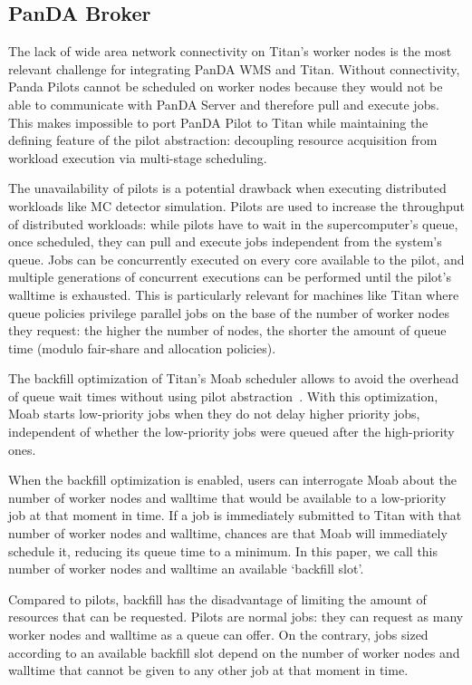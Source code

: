 \subsection{PanDA Broker}\label{ssec:panda_titan}

The lack of wide area network connectivity on Titan's worker nodes is the
most relevant challenge for integrating PanDA WMS and Titan. Without
connectivity, Panda Pilots cannot be scheduled on worker nodes because they
would not be able to communicate with PanDA Server and therefore pull and
execute jobs. This makes impossible to port PanDA Pilot to Titan while
maintaining the defining feature of the pilot abstraction: decoupling
resource acquisition from workload execution via multi-stage scheduling.

The unavailability of pilots is a potential drawback when executing
distributed workloads like MC detector simulation. Pilots are used to
increase the throughput of distributed workloads: while pilots have to wait
in the supercomputer's queue, once scheduled, they can pull and execute jobs
independent from the system's queue. Jobs can be concurrently executed on
every core available to the pilot, and multiple generations of concurrent
executions can be performed until the pilot's walltime is exhausted. This is
particularly relevant for machines like Titan where queue policies privilege
parallel jobs on the base of the number of worker nodes they request: the
higher the number of nodes, the shorter the amount of queue time (modulo
fair-share and allocation policies).

The backfill optimization of Titan's Moab scheduler allows to avoid the
overhead of queue wait times without using pilot
abstraction~\cite{maui_backfill_url}. With this optimization, Moab starts
low-priority jobs when they do not delay higher priority jobs, independent of
whether the low-priority jobs were queued after the high-priority ones.

When the backfill optimization is enabled, users can interrogate Moab about
the number of worker nodes and walltime that would be available to a
low-priority job at that moment in time. If a job is immediately submitted to
Titan with that number of worker nodes and walltime, chances are that Moab
will immediately schedule it, reducing its queue time to a minimum. In this
paper, we call this number of worker nodes and walltime an available
`backfill slot'.

Compared to pilots, backfill has the disadvantage of limiting the amount of
resources that can be requested. Pilots are normal jobs: they can request as
many worker nodes and walltime as a queue can offer. On the contrary, jobs
sized according to an available backfill slot depend on the number of worker
nodes and walltime that cannot be given to any other job at that moment in
time.

